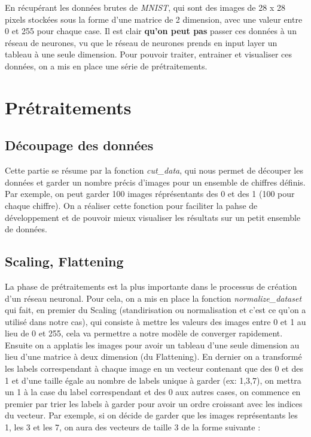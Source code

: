 \documentclass[oneside,13pt,a4paper]{report}
\begin{document}
En récupérant les données brutes de \textit{MNIST}, qui sont des images de 28 x 28 pixels stockées sous la forme d'une matrice de 2 dimension, avec une valeur entre 0 et 255 pour chaque case. Il est clair \textbf{qu'on peut pas} passer ces données à un réseau de neurones, vu que le réseau de neurones prends en input layer un tableau à une seule dimension.
Pour pouvoir traiter, entrainer et visualiser ces données, on a mis en place une série de prétraitements.

\section{Prétraitements} 

\subsection{Découpage des données}

Cette partie se résume par la fonction \textit{cut\_data}, qui nous permet de découper les données et garder un nombre précis d'images pour un ensemble de chiffres définis. Par exemple, on peut garder 100 images réprésentants des 0 et des 1 (100 pour chaque chiffre). On a réaliser cette fonction pour faciliter la pahse de développement et de pouvoir mieux visualiser les résultats sur un petit ensemble de données.

\subsection{Scaling, Flattening}

La phase de prétraitements est la plus importante dans le processus de création d’un réseau neuronal. Pour cela, on a mis en place 
la fonction \textit{normalize\_dataset} qui fait, en premier du Scaling (standirisation ou normalisation et c'est ce qu'on a utilisé dans notre cas), qui consiste à mettre les valeurs des images entre 0 et 1 au lieu de 0 et 255, cela va permettre a notre modèle de converger rapidement. Ensuite on a applatis les images pour avoir un tableau d'une seule dimension au lieu d'une matrice à deux dimension (du Flattening). En dernier on a transformé les labels correspendant à chaque image en un vecteur contenant que des 0 et des 1 et d'une taille égale au nombre de labels unique à garder (ex: 1,3,7), on mettra un 1 à la case du label correspendant et des 0 aux autres cases, on commence en premier par trier les labels à garder pour avoir un ordre croissant avec les indices du vecteur. Par exemple, si on décide de garder que les images représentants les 1, les 3 et les 7, on aura des vecteurs de taille 3 de la forme suivante : 
\end{document}
